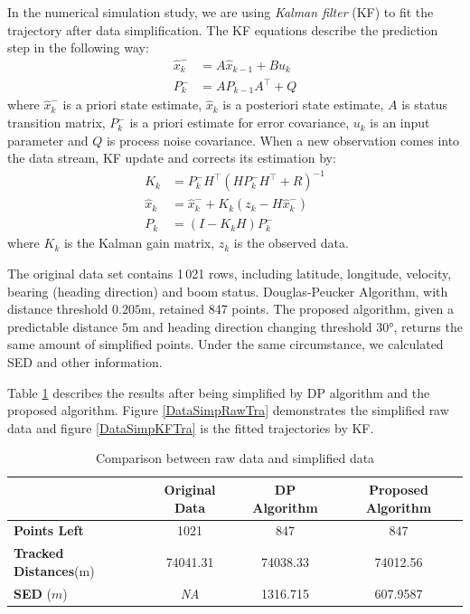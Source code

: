 In the numerical simulation study, we are using \textit{Kalman filter} (KF) to fit the trajectory after data simplification. The KF equations describe the prediction step in the following way: 
\begin{align*}
\hat{x}_k^-&=A\hat{x}_{k-1}+Bu_k \\
P_k^-&=AP_{k-1}A^\top+Q
\end{align*}
where $\hat{x}_k^-$ is a priori state estimate, $\hat{x}_k$ is a posteriori state estimate, $A$ is status transition matrix, $P_k^-$ is a priori estimate for error covariance, $u_k$ is an input parameter and $Q$ is process noise covariance. When a new observation comes into the data stream, KF update and corrects its estimation by: 
\begin{align*}
K_k&=P_k^-H^\top \left(HP_k^-H^\top+R\right)^{-1} \\
\hat{x}_k&=\hat{x}_k^-+K_k\left(z_k-H\hat{x}_k^-\right) \\
P_k&=(I-K_kH)P_k^-
\end{align*}
where $K_k$ is the Kalman gain matrix, $z_k$ is the observed data.


The original data set contains 1\,021 rows, including latitude, longitude, velocity, bearing (heading direction) and boom status. Douglas-Peucker Algorithm, with distance threshold $0.205$m, retained 847 points. The proposed algorithm, given a predictable distance $5$m and heading direction changing threshold $\ang{30}$, returns the same amount of simplified points. Under the same circumstance, we calculated SED and other information. 

Table \ref{DataSimpCompTable} describes the results after being simplified by DP algorithm and the proposed algorithm. Figure \ref{DataSimpRawTra} demonstrates the simplified raw data and figure \ref{DataSimpKFTra} is the fitted trajectories by KF. 

\begin{table}
\centering
\caption{Comparison between raw data and simplified data}
\label{DataSimpCompTable}
\begin{tabular}{|l|c|c|c|}
\hline 
  & \textbf{Original Data} & \textbf{DP Algorithm} & \textbf{Proposed Algorithm}  \\
\hline 
\textbf{Points Left} & 1021   & 847   & 847 \\
\hline 
\textbf{Tracked Distances}(m)  & 74041.31     & 74038.33    & 74012.56     \\
\hline 
\textbf{SED} ($m$)    & \textit{NA}    & 1316.715    & 607.9587   \\
\hline 
\end{tabular}
\end{table}


